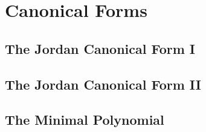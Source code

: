 \setcounter{chapter}{6}
\chapter{Canonical Forms}

\section{The Jordan Canonical Form I}



\vspace{12pt}

\setcounter{Exercise}{2}


\vspace{12pt}

\setcounter{Exercise}{12}



\section{The Jordan Canonical Form II}



\vspace{12pt}

\setcounter{Exercise}{3}


\vspace{12pt}



\vspace{12pt}




\section{The Minimal Polynomial}



\vspace{12pt}



\vspace{12pt}

\setcounter{Exercise}{4}



